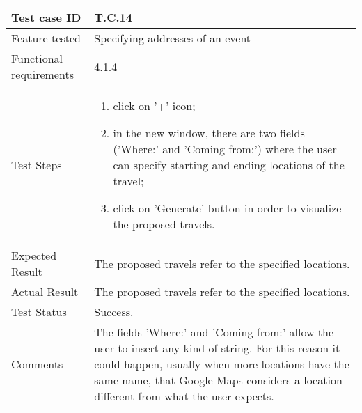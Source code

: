 \begin{table}[H]
	\begin{center}
		\begin{tabular}{ | p{} | p{} | }
		\hline
		Test case ID & T.C.14\\
		\hline
		Feature tested & Specifying addresses of an event\\
		\hline
		Functional requirements & 4.1.4 \\
    	\hline
		Test Steps & 
			\begin{enumerate}
				\item click on '+' icon;
				\item in the new window, there are two fields ('Where:' and 'Coming from:') where the user can specify starting and ending locations of the travel;
				\item click on 'Generate' button in order to visualize the proposed travels.
			\end{enumerate} \\
		\hline
		Expected Result & The proposed travels refer to the specified locations.\\
		\hline
		Actual Result & The proposed travels refer to the specified locations.\\ 
		\hline
		Test Status & \color{ForestGreen}Success.\\ 
		\hline
		Comments & The fields 'Where:' and 'Coming from:' allow the user to insert any kind of string. For this reason it could happen, usually when more locations have the same name, that Google Maps considers a location different from what the user expects. \\ 
		\hline
		
		\end{tabular}
	\end{center}
\end{table}

